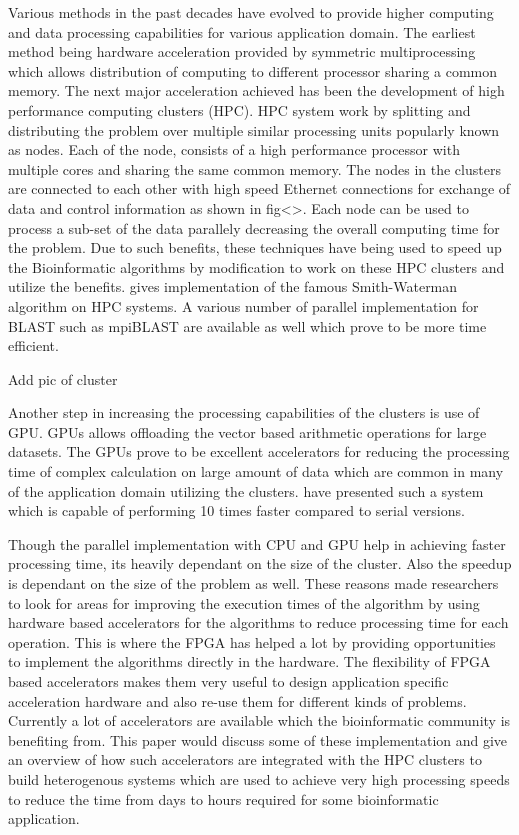 \documentclass[12pt,twoside]{article}
\begin{document}
Various methods in the past decades have evolved to provide higher computing and data processing capabilities for various application domain.
The earliest method being hardware acceleration provided by symmetric multiprocessing which allows distribution of computing to different processor
sharing a common memory. The next major acceleration achieved has been the development of high performance computing clusters (HPC).  HPC
system work by splitting and distributing the problem over multiple similar processing units popularly known as nodes. Each of the node,
consists of a high performance processor with multiple cores and sharing the same common memory. The nodes in the clusters are connected to
each other with high speed Ethernet connections for exchange of data and control information as shown in fig<>. Each node can be used to
process a sub-set of the data parallely decreasing the overall computing time for the problem. Due to such benefits, these techniques have
being used to speed up the Bioinformatic algorithms by modification to work on these HPC clusters and utilize the benefits.
\cite{boukerche_parallel_2005,martins_multithreaded_2000} gives implementation of the famous Smith-Waterman algorithm on HPC systems.
A various number of parallel implementation for BLAST such as mpiBLAST \cite{darling_design_2003} are available as well which prove
to be more time efficient.

{Add pic of cluster} 

Another step in increasing the processing capabilities of the clusters is use of GPU. GPUs allows offloading
the vector based arithmetic operations for large datasets. The GPUs prove to be excellent accelerators for reducing
the processing time of complex calculation on large amount of data which are common in many of the application domain
utilizing the clusters. \textcite{liu_cuda-blastp_2011} have presented such a system which is capable of performing
10 times faster compared to serial versions.

Though the parallel implementation with CPU and GPU help in achieving faster processing time, its heavily dependant
on the size of the cluster. Also the speedup is dependant on the size of the problem as well. These reasons
made researchers to look for areas for improving the execution times of the algorithm by using hardware based
accelerators for the algorithms to reduce processing time for each operation. This is where the FPGA has 
helped a lot by providing opportunities to implement the algorithms directly in the hardware. The flexibility
of FPGA based accelerators makes them very useful to design application specific acceleration hardware and
also re-use them for different kinds of problems. Currently a lot of accelerators are available which the bioinformatic
community is benefiting from. This paper would discuss some of these implementation and give an overview of how
such accelerators are integrated with the HPC clusters to build heterogenous systems which are used to
achieve very high processing speeds to reduce the time from days to hours required for some bioinformatic application.
\end{document}

